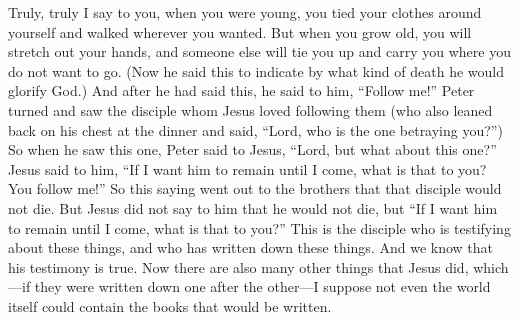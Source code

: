 \begin{biblechapter}
\verse Truly, truly I say to you, when you were young, you tied your clothes around yourself and walked wherever you wanted. But when you grow old, you will stretch out your hands, and someone else will tie you up and carry you where you do not want to go.
\verse (Now he said this to indicate by what kind of death he would glorify God.) And after he had said this, he said to him, “Follow me!”
 Peter turned and saw the disciple whom Jesus loved following them (who also leaned back on his chest at the dinner and said, “Lord, who is the one betraying you?”)
\verse So when he saw this one, Peter said to Jesus, “Lord, but what about this one?”
\verse Jesus said to him, “If I want him to remain until I come, what is that to you? You follow me!”
\verse So this saying went out to the brothers that that disciple would not die. But Jesus did not say to him that he would not die, but “If I want him to remain until I come, what is that to you?”
 This is the disciple who is testifying about these things, and who has written down these things. And we know that his testimony is true.
\verse Now there are also many other things that Jesus did, which—if they were written down one after the other—I suppose not even the world itself could contain the books that would be written.
\end{biblechapter}


